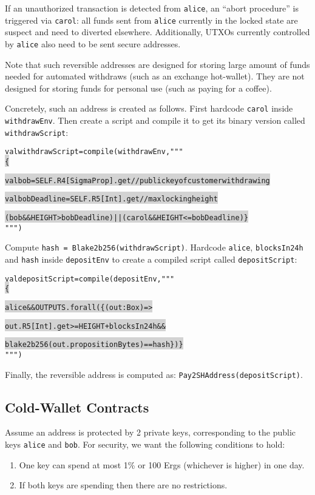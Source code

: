 \documentclass[11pt]{article}
\newcommand\Hi[2][lightgray]{%
	\hspace*{-\fboxsep}%
	\colorbox{#1}{#2}%
	\hspace*{-\fboxsep}%
}
\begin{document}
If an unauthorized transaction is detected from \texttt{alice}, an ``abort procedure'' is triggered via \texttt{carol}: all funds sent from \texttt{alice} currently in the locked state are suspect and need to diverted elsewhere. Additionally, UTXOs currently controlled by \texttt{alice} also need to be sent secure addresses. 

Note that such reversible addresses are designed for storing large amount of funds needed for automated withdraws (such as an exchange hot-wallet). They are not designed for storing funds for personal use (such as paying for a coffee).

Concretely, such an address is created as follows. First hardcode \texttt{carol} inside \texttt{withdrawEnv}. Then create a script and compile it to get its binary version called \texttt{withdrawScript}:
\begin{alltt}
val withdrawScript = compile(withdrawEnv, """ \Hi{\{}
  \Hi{val bob         = SELF.R4[SigmaProp].get // public key of customer withdrawing}
  \Hi{val bobDeadline = SELF.R5[Int].get       // max locking height}
  \Hi{(bob && HEIGHT > bobDeadline) || (carol && HEIGHT <= bobDeadline) \}} """)
\end{alltt}

Compute \texttt{hash = Blake2b256(withdrawScript)}. Hardcode \texttt{alice}, \texttt{blocksIn24h} and \texttt{hash} inside \texttt{depositEnv} to create a compiled script called \texttt{depositScript}:

\begin{alltt}
	val depositScript = compile(depositEnv, """ \Hi{\{}
  \Hi{alice && OUTPUTS.forall( \{(out:Box) =>}
    \Hi{out.R5[Int].get >= HEIGHT + blocksIn24h && }
    \Hi{blake2b256(out.propositionBytes) == hash\} ) \}} """)
\end{alltt}

Finally, the reversible address is computed as: \texttt{Pay2SHAddress(depositScript)}.

\subsection{Cold-Wallet Contracts}

Assume an address is protected by 2 private keys, corresponding to the public keys \texttt{alice} and \texttt{bob}. For security, we want the following conditions to hold:

\begin{enumerate}
	\item One key can spend at most 1\% or 100 Ergs (whichever is higher) in one day.
	\item If both keys are spending then there are no restrictions. 
\end{enumerate}
\end{document}
